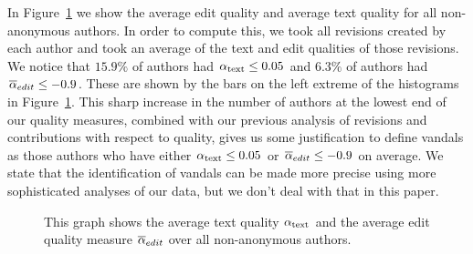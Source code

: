 In Figure~\ref{fig-user-quality} we show the average edit quality
and average text quality for all non-anonymous authors.
In order to compute this, we took all revisions created by each 
author and took an average of the text and edit qualities of 
those revisions.
We notice that $15.9\%$ of authors had $\alpha_\text{text} \le 0.05$
and $6.3\%$ of authors had ${\overline{\alpha}}_{edit} \le -0.9$.
These are shown by the bars on the left extreme of the
histograms in Figure~\ref{fig-user-quality}.
This sharp increase in the number of authors at the lowest end
of our quality measures, combined with our previous analysis
of revisions and contributions with respect to quality, gives
us some justification to define vandals as those
authors who have either $\alpha_\text{text} \le 0.05$ or 
${\overline{\alpha}}_{edit} \le -0.9$ on average.
We state that the identification of vandals can be made more
precise using more sophisticated analyses of our data, but we
don't deal with that in this paper.
%
\begin{figure}[t]
    \begin{center}
    \end{center}
    \caption[Measuring edit and text quality for all authors]{
    	This graph shows the average text quality $\alpha_\text{text}$
	and the average edit quality measure ${\overline{\alpha}}_{edit}$
	over all non-anonymous authors.
    }
    \label{fig-user-quality}
\end{figure}
%

